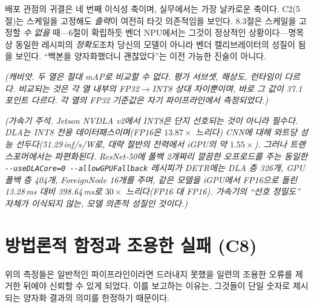 \documentclass[11pt]{article}
\begin{document}
배포 관점의 귀결은 네 번째 이식성 축이며, 실무에서는 가장 날카로운 축이다. C2(5절)는 스케일을 고정해도 \emph{출력}이 여전히 타깃 의존적임을 보인다. 8.3절은 스케일을 고정할 \emph{수 없을} 때---6절이 확립하듯 벤더 NPU에서는 그것이 정상적인 상황이다---명목상 동일한 레시피의 \emph{정확도}조차 당신의 모델이 아니라 벤더 캘리브레이터의 성질이 됨을 보인다. ``백본을 양자화했더니 괜찮았다''는 이전 가능한 진술이 아니다.

\emph{(캐비앗. 두 열은 절대 mAP로 비교할 수 없다. 평가 서브셋, 해상도, 런타임이 다르다. 비교되는 것은 각 열 내부의 FP32$\rightarrow$INT8 상대 차이뿐이며, 바로 그 값이 37.1포인트 다르다. 각 열의 FP32 기준값은 자기 파이프라인에서 측정되었다.)}

\emph{(가속기 주석. Jetson NVDLA v2에서 INT8은 단지 선호되는 것이 아니라 필수다. DLA는 INT8 전용 데이터패스이며(FP16은 $13.87\times$ 느리다) CNN에 대해 와트당 성능 선두다(51.29\,inf/s/W로, 대략 절반의 전력에서 iGPU의 약 $1.55\times$). 그러나 트랜스포머에서는 파편화된다. ResNet-50에 폴백 2개짜리 깔끔한 오프로드를 주는 동일한 \texttt{-{}-useDLACore=0 -{}-allowGPUFallback} 레시피가 DETR에는 DLA 층 326개, GPU 폴백 층 404개, ForeignNode 16개를 주며, 같은 모델을 iGPU에서 FP16으로 돌린 13.28\,ms 대비 398.64\,ms로 \textbf{$30\times$} 느리다(FP16 대 FP16). 가속기의 ``선호 정밀도'' 자체가 이식되지 않는, 모델 의존적 성질인 것이다.)}

\section{방법론적 함정과 조용한 실패 (C8)}

위의 측정들은 일반적인 파이프라인이라면 드러내지 못했을 일련의 조용한 오류를 제거한 뒤에야 신뢰할 수 있게 되었다. 이를 보고하는 이유는, 그것들이 단일 숫자로 제시되는 양자화 결과의 의미를 한정하기 때문이다.
\end{document}
